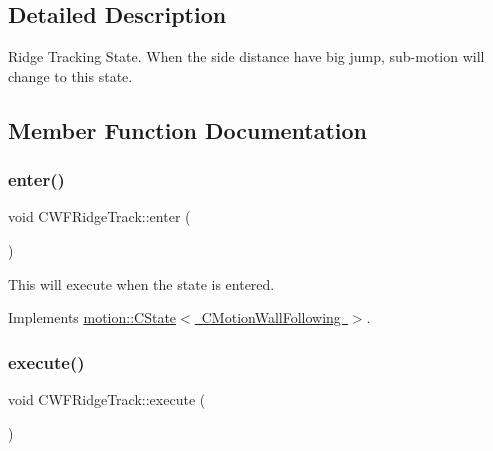 \subsection{Detailed Description}
Ridge Tracking State. When the side distance have big jump, sub-\/motion will change to this state. 

\subsection{Member Function Documentation}
\mbox{\label{classmotion_1_1CWFRidgeTrack_a216b8b7778464a2afd1a4f57da4317de}} 
\subsubsection{\texorpdfstring{enter()}{enter()}}
{\footnotesize\ttfamily void C\+W\+F\+Ridge\+Track\+::enter (\begin{DoxyParamCaption}\item[{\mbox{\hyperlink{classmotion_1_1CMotionWallFollowing}{C\+Motion\+Wall\+Following}} $\ast$}]{ }\end{DoxyParamCaption})\hspace{0.3cm}{\ttfamily [virtual]}}

This will execute when the state is entered. 

Implements \mbox{\hyperlink{classmotion_1_1CState_a53d5fcfec223b58ccdd364a8430fd23c}{motion\+::\+C\+State$<$ C\+Motion\+Wall\+Following $>$}}.

\mbox{\label{classmotion_1_1CWFRidgeTrack_a68b351694d461637ad97c5d657f3fbca}} 
\subsubsection{\texorpdfstring{execute()}{execute()}}
{\footnotesize\ttfamily void C\+W\+F\+Ridge\+Track\+::execute (\begin{DoxyParamCaption}\item[{\mbox{\hyperlink{classmotion_1_1CMotionWallFollowing}{C\+Motion\+Wall\+Following}} $\ast$}]{ }\end{DoxyParamCaption})\hspace{0.3cm}{\ttfamily [virtual]}}

